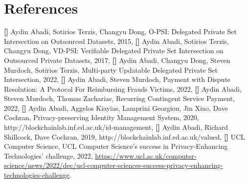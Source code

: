 




\section*{References}
%
\textbf{[\y]} Aydin Abadi, Sotirios Terzis, Changyu Dong, O-PSI: Delegated Private Set Intersection on Outsourced Datasets, 2015, \textbf{[\y]} Aydin Abadi, Sotirios Terzis, Changyu Dong, VD-PSI: Verifiable Delegated Private Set Intersection on Outsourced Private Datasets, 2017, \textbf{[\y]} Aydin Abadi, Changyu Dong, Steven Murdoch, Sotirios Terzis, Multi-party Updatable Delegated Private Set Intersection, 2022, \textbf{[\y]} Aydin Abadi, Steven Murdoch, Payment with Dispute Resolution:
A Protocol For Reimbursing Frauds Victims, 2022, \textbf{[\y]} Aydin Abadi, Steven Murdoch, Thomas Zacharias, Recurring Contingent Service Payment, 2022, \textbf{[\y]} Aydin Abadi, Aggelos Kiayias, Lamprini Georgiou, Jin Xiao, Dave Cochran, Privacy-preserving Identity Management System, 2020, http://blockchainlab.inf.ed.ac.uk/id-management, \textbf{[\y]} Aydin Abadi, Richard Shillcock, Dave Cochran, 2019, http://blockchainlab.inf.ed.ac.uk/valued, \textbf{[\y]} UCL Computer Science, UCL Computer Science's success in Privacy-Enhancing Technologies' challenge, 2022, \href{https://www.ucl.ac.uk/computer-science/news/2022/dec/ucl-computer-sciences-success-privacy-enhancing-technologies-challenge}{https://www.ucl.ac.uk/computer-science/news/2022/dec/ucl-computer-sciences-success-privacy-enhancing-technologies-challenge}. 





